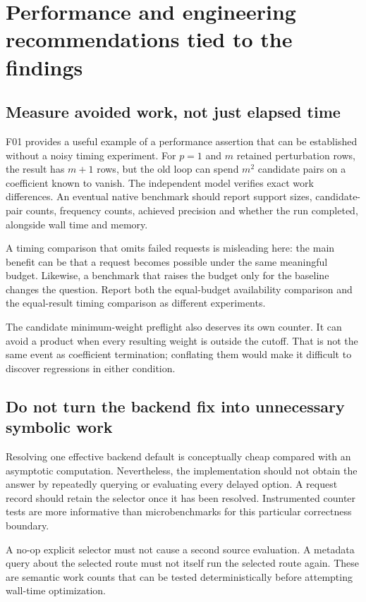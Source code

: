 \documentclass[11pt,a4paper]{article}
\begin{document}
\section{Performance and engineering recommendations tied to the findings}
\label{sec:performance}
\subsection{Measure avoided work, not just elapsed time}
F01 provides a useful example of a performance assertion that can be established without a noisy timing experiment. For $p=1$ and $m$ retained perturbation rows, the result has $m+1$ rows, but the old loop can spend $m^2$ candidate pairs on a coefficient known to vanish. The independent model verifies exact work differences. An eventual native benchmark should report support sizes, candidate-pair counts, frequency counts, achieved precision and whether the run completed, alongside wall time and memory.

A timing comparison that omits failed requests is misleading here: the main benefit can be that a request becomes possible under the same meaningful budget. Likewise, a benchmark that raises the budget only for the baseline changes the question. Report both the equal-budget availability comparison and the equal-result timing comparison as different experiments.

The candidate minimum-weight preflight also deserves its own counter. It can avoid a product when every resulting weight is outside the cutoff. That is not the same event as coefficient termination; conflating them would make it difficult to discover regressions in either condition.

\subsection{Do not turn the backend fix into unnecessary symbolic work}
Resolving one effective backend default is conceptually cheap compared with an asymptotic computation. Nevertheless, the implementation should not obtain the answer by repeatedly querying or evaluating every delayed option. A request record should retain the selector once it has been resolved. Instrumented counter tests are more informative than microbenchmarks for this particular correctness boundary.

A no-op explicit selector must not cause a second source evaluation. A metadata query about the selected route must not itself run the selected route again. These are semantic work counts that can be tested deterministically before attempting wall-time optimization.
\end{document}
